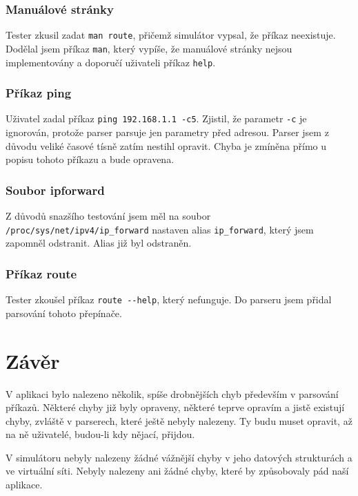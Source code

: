\subsubsection{Manuálové stránky}

Tester zkusil zadat \verb|man route|, přičemž simulátor vypsal, že příkaz neexistuje. Dodělal jsem příkaz \verb|man|, který vypíše, že manuálové stránky nejsou implementovány a doporučí uživateli příkaz \verb|help|.

\subsubsection{Příkaz ping}

Uživatel zadal příkaz \verb|ping 192.168.1.1 -c5|. Zjistil, že parametr \verb|-c| je ignorován, protože parser parsuje jen parametry před adresou. Parser jsem z důvodu veliké časové tísně zatím nestihl opravit. Chyba je zmíněna přímo u popisu tohoto příkazu a bude opravena.

\subsubsection{Soubor ipforward}

Z důvodů snazšího testování jsem měl na soubor \verb|/proc/sys/net/ipv4/ip_forward| nastaven alias \verb|ip_forward|, který jsem zapomněl odstranit. Alias již byl odstraněn.

\subsubsection{Příkaz route}

Tester zkoušel příkaz \verb|route --help|, který nefunguje. Do parseru jsem přidal parsování tohoto přepínače.




\section{Závěr}

V aplikaci bylo nalezeno několik, spíše drobnějších chyb především v parsování příkazů. Některé chyby již byly opraveny, některé teprve opravím a jistě existují chyby, zvláště v parserech, které ještě nebyly nalezeny. Ty budu muset opravit, až na ně uživatelé, budou-li kdy nějací, přijdou.

V simulátoru nebyly nalezeny žádné vážnější chyby v jeho datových strukturách a ve virtuální síti. Nebyly nalezeny ani žádné chyby, které by způsobovaly pád naší aplikace.
